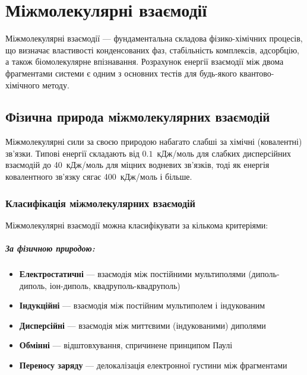 \chapter{Міжмолекулярні взаємодії}

Міжмолекулярні взаємодії --- фундаментальна складова фізико-хімічних процесів, що визначає властивості конденсованих фаз, стабільність комплексів, адсорбцію, а також біомолекулярне впізнавання. Розрахунок енергії взаємодії між двома фрагментами системи є одним з основних тестів для будь-якого квантово-хімічного методу.

\section{Фізична природа міжмолекулярних взаємодій}

Міжмолекулярні сили за своєю природою набагато слабші за хімічні (ковалентні) зв'язки. Типові енергії складають від $0.1$~кДж/моль для слабких дисперсійних взаємодій до 40~кДж/моль для міцних водневих зв'язків, тоді як енергія ковалентного зв'язку сягає 400~кДж/моль і більше.

\subsection{Класифікація міжмолекулярних взаємодій}

Міжмолекулярні взаємодії можна класифікувати за кількома критеріями:

\paragraph{За фізичною природою:}
\begin{itemize}
    \item \textbf{Електростатичні} --- взаємодія між постійними мультиполями (диполь-диполь, іон-диполь, квадруполь-квадруполь)
    \item \textbf{Індукційні} --- взаємодія між постійним мультиполем і індукованим
    \item \textbf{Дисперсійні} --- взаємодія між миттєвими (індукованими) диполями
    \item \textbf{Обмінні} --- відштовхування, спричинене принципом Паулі
    \item \textbf{Переносу заряду} --- делокалізація електронної густини між фрагментами
\end{itemize}

